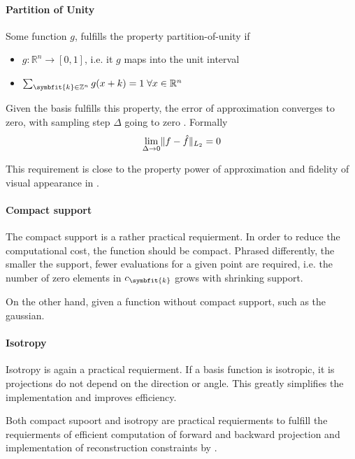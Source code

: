 \paragraph{Partition of Unity}
 
Some function $g$, fulfills the property partition-of-unity if
\begin{itemize}
    \item $g: \mathbb{R}^n \to [0, 1]$, i.e. it $g$ maps into the unit interval
    \item $\sum_{\symbfit{k} \in \mathbb{Z}^n} g(x + k) = 1 \; \forall x \in \mathbb{R}^n$
\end{itemize}
Given the basis fulfills this property, the error of approximation converges to zero, with sampling 
step $\Delta$ going to zero \cite{nilchian_optimized_2015}. Formally
\begin{equation}
    \lim_{\Delta \to 0} \lVert f - \hat{f}\rVert_{L_2} = 0
\end{equation}

This requirement is close to the property power of approximation and fidelity of visual
appearance in \cite{hanson_local_1985}.

\paragraph{Compact support}

The compact support is a rather practical requierment. In order to reduce the computational cost,
the function should be compact. Phrased differently, the smaller the support, fewer evaluations
    for a given point are required, i.e. the number of zero elements in $c_{\symbfit{k}}$ grows with shrinking
support.

On the other hand, given a function without compact support, such as the gaussian.

\paragraph{Isotropy}

Isotropy is again a practical requierment. If a basis function is isotropic, it is projections
do not depend on the direction or angle. This greatly simplifies the implementation and improves efficiency.

Both compact supoort and isotropy are practical requierments to fulfill the requierments of
efficient computation of forward and backward projection and implementation of reconstruction constraints
by \cite{hanson_local_1985}.

